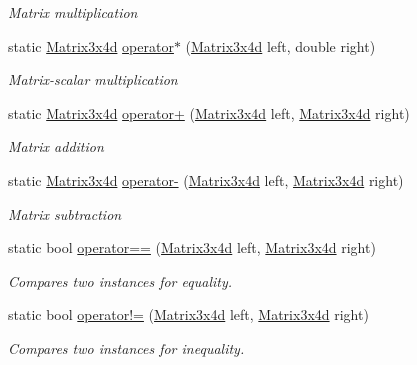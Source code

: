 \begin{DoxyCompactItemize}
\begin{DoxyCompactList}\small\item\em Matrix multiplication \end{DoxyCompactList}\item 
static \hyperlink{struct_open_t_k_1_1_matrix3x4d}{Matrix3x4d} \hyperlink{struct_open_t_k_1_1_matrix3x4d_a48764b41f102005e362c79ce63eca035}{operator$\ast$} (\hyperlink{struct_open_t_k_1_1_matrix3x4d}{Matrix3x4d} left, double right)
\begin{DoxyCompactList}\small\item\em Matrix-\/scalar multiplication \end{DoxyCompactList}\item 
static \hyperlink{struct_open_t_k_1_1_matrix3x4d}{Matrix3x4d} \hyperlink{struct_open_t_k_1_1_matrix3x4d_a85d97e32aee9bf6aae61f0754e7287b3}{operator+} (\hyperlink{struct_open_t_k_1_1_matrix3x4d}{Matrix3x4d} left, \hyperlink{struct_open_t_k_1_1_matrix3x4d}{Matrix3x4d} right)
\begin{DoxyCompactList}\small\item\em Matrix addition \end{DoxyCompactList}\item 
static \hyperlink{struct_open_t_k_1_1_matrix3x4d}{Matrix3x4d} \hyperlink{struct_open_t_k_1_1_matrix3x4d_a79299763eb4455b49a0d7f03359e2857}{operator-\/} (\hyperlink{struct_open_t_k_1_1_matrix3x4d}{Matrix3x4d} left, \hyperlink{struct_open_t_k_1_1_matrix3x4d}{Matrix3x4d} right)
\begin{DoxyCompactList}\small\item\em Matrix subtraction \end{DoxyCompactList}\item 
static bool \hyperlink{struct_open_t_k_1_1_matrix3x4d_aa3e8151d71be52f850d11019f481ddd5}{operator==} (\hyperlink{struct_open_t_k_1_1_matrix3x4d}{Matrix3x4d} left, \hyperlink{struct_open_t_k_1_1_matrix3x4d}{Matrix3x4d} right)
\begin{DoxyCompactList}\small\item\em Compares two instances for equality. \end{DoxyCompactList}\item 
static bool \hyperlink{struct_open_t_k_1_1_matrix3x4d_a12776ba88f24244c0bb60ac364498a1c}{operator!=} (\hyperlink{struct_open_t_k_1_1_matrix3x4d}{Matrix3x4d} left, \hyperlink{struct_open_t_k_1_1_matrix3x4d}{Matrix3x4d} right)
\begin{DoxyCompactList}\small\item\em Compares two instances for inequality. \end{DoxyCompactList}\end{DoxyCompactItemize}
